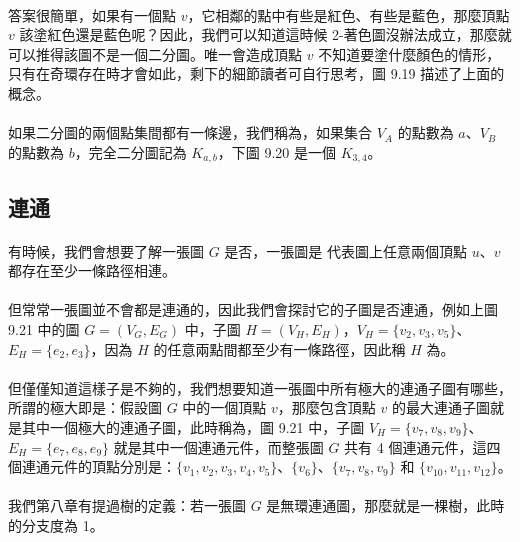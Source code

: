 \documentclass[12pt,a4paper,oneside]{report}
\begin{document}
\begin{CJK}{UTF8}{bkai}
\paragraph{}答案很簡單，如果有一個點 $v$，它相鄰的點中有些是紅色、有些是藍色，那麼頂點 $v$ 該塗紅色還是藍色呢？因此，我們可以知道這時候 2-著色圖沒辦法成立，那麼就可以推得該圖不是一個二分圖。唯一會造成頂點 $v$ 不知道要塗什麼顏色的情形，只有在奇環存在時才會如此，剩下的細節讀者可自行思考，圖 9.19 描述了上面的概念。
\paragraph{}如果二分圖的兩個點集間都有一條邊，我們稱為\textbf{}，如果集合 $V_A$ 的點數為 $a$、$V_B$ 的點數為 $b$，完全二分圖記為 $K_{a,b}$，下圖 9.20 是一個 $K_{3,4}$。

\subsection{連通}
\paragraph{}有時候，我們會想要了解一張圖 $G$ 是否\textbf{}，一張圖是\textbf{} 代表圖上任意兩個頂點 $u$、$v$ 都存在至少一條路徑相連。
\paragraph{}但常常一張圖並不會都是連通的，因此我們會探討它的子圖是否連通，例如上圖 9.21 中的圖 $G=(V_G,E_G)$ 中，子圖 $H=(V_H,E_H)$，$V_H=\{{v_2,v_3,v_5}\}$、$E_H=\{{e_2,e_3}\}$，因為 $H$ 的任意兩點間都至少有一條路徑，因此稱 $H$ 為\textbf{}。
\paragraph{}但僅僅知道這樣子是不夠的，我們想要知道一張圖中所有極大的連通子圖有哪些，所謂的極大即是：假設圖 $G$ 中的一個頂點 $v$，那麼包含頂點 $v$ 的最大連通子圖就是其中一個極大的連通子圖，此時稱為\textbf{}，圖 9.21 中，子圖 $V_H=\{{v_7,v_8,v_9}\}$、$E_H=\{{e_7,e_8,e_9}\}$ 就是其中一個連通元件，而整張圖 $G$ 共有 4 個連通元件，這四個連通元件的頂點分別是：$\{v_1,v_2,v_3,v_4,v_5\}$、$\{v_6\}$、$\{v_7,v_8,v_9\}$ 和 $\{v_{10},v_{11},v_{12}\}$。
\paragraph{}我們第八章有提過樹的定義：若一張圖 $G$ 是無環連通圖，那麼就是一棵樹，此時 的分支度為 1。


\end{CJK}
\end{document}
